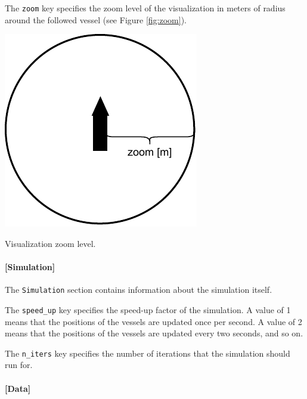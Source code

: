 \documentclass[
	a4paper, %
	12pt, %
]{persist}
\begin{document}
The \verb|zoom| key specifies the zoom level of the visualization in meters of radius around the followed vessel (see Figure \ref{fig:zoom}).
\begin{marginfigure}
	\includegraphics[width=\linewidth]{img/zoom.pdf}
	\caption{Visualization zoom level.}
	\label{fig:zoom}
\end{marginfigure}


\paragraph{[Simulation]}

The \verb|Simulation| section contains information about the simulation itself.

The \verb|speed_up| key specifies the speed-up factor of the simulation. A value of 1 means that the positions of the vessels are updated once per second. A value of 2 means that the positions of the vessels are updated every two seconds, and so on.

The \verb|n_iters| key specifies the number of iterations that the simulation should run for.

\paragraph{[Data]}
\end{document}
